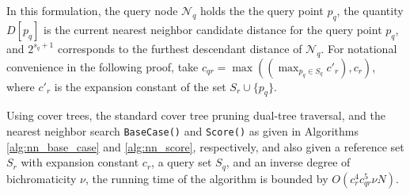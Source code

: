 In this formulation, the query node $\mathscr{N}_q$ holds the the query point
$p_q$, the quantity $D[p_q]$ is the current nearest neighbor candidate distance
for the query point $p_q$, and $2^{s_q + 1}$ corresponds to the furthest
descendant distance of $\mathscr{N}_q$.  For notational convenience in the
following proof, take $c_{qr} = \max((\max_{p_q \in S_q} c'_r), c_r)$, where
$c'_r$ is the expansion constant of the set $S_r \cup \{ p_q \}$.



\begin{thm}
Using cover trees, the standard cover tree pruning dual-tree traversal, and the
nearest neighbor search \texttt{BaseCase()} and \texttt{Score()} as given in
Algorithms \ref{alg:nn_base_case} and \ref{alg:nn_score}, respectively, and also
given a reference set $S_r$ with expansion constant $c_r$, a query set $S_q$,
and an inverse degree of bichromaticity $\nu$, the running time of the
algorithm is bounded by $O(c_r^4 c_{qr}^5 \nu N)$.
\label{thm:nns}
\end{thm}


